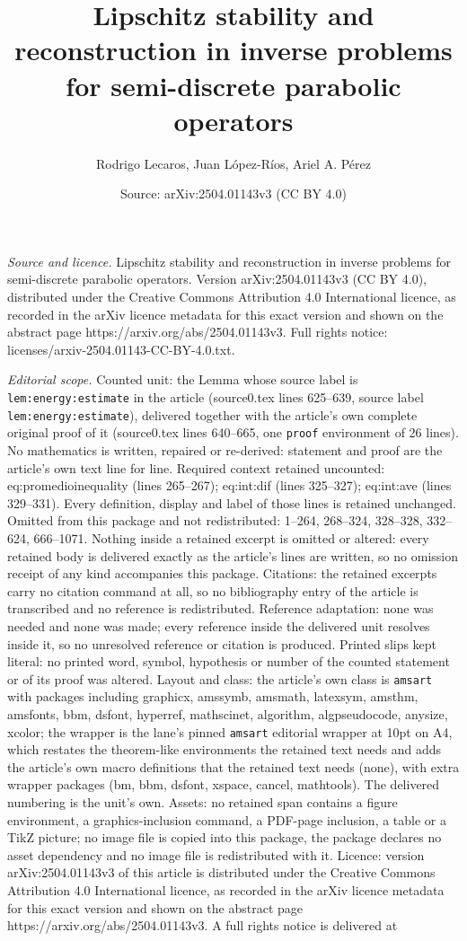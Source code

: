 \documentclass[10pt,a4paper]{amsart}
\title[Lipschitz stability and reconstruction in inverse problems f]{Lipschitz stability and reconstruction in inverse problems for semi-discrete parabolic operators}
\author{Rodrigo Lecaros, Juan L\'opez-R\'ios, Ariel A. P\'erez}
\date{Source: arXiv:2504.01143v3 (CC BY 4.0)}
\begin{document}
\maketitle

\noindent\emph{Source and licence.} Lipschitz stability and reconstruction in inverse problems for semi-discrete parabolic operators. Version arXiv:2504.01143v3 (CC BY 4.0), distributed under the Creative Commons Attribution 4.0 International licence, as recorded in the arXiv licence metadata for this exact version and shown on the abstract page https://arxiv.org/abs/2504.01143v3. Full rights notice: licenses/arxiv-2504.01143-CC-BY-4.0.txt.\par\smallskip

\noindent\textit{Editorial scope.} Counted unit: the Lemma whose source label is \texttt{lem:energy:estimate} in the article (source0.tex lines 625--639, source label \texttt{lem:energy:estimate}), delivered together with the article's own complete original proof of it (source0.tex lines 640--665, one \texttt{proof} environment of 26 lines). No mathematics is written, repaired or re-derived: statement and proof are the article's own text line for line. Required context retained uncounted: eq:promedioinequality (lines 265--267); eq:int:dif (lines 325--327); eq:int:ave (lines 329--331). Every definition, display and label of those lines is retained unchanged. Omitted from this package and not redistributed: 1--264, 268--324, 328--328, 332--624, 666--1071. Nothing inside a retained excerpt is omitted or altered: every retained body is delivered exactly as the article's lines are written, so no omission receipt of any kind accompanies this package. Citations: the retained excerpts carry no citation command at all, so no bibliography entry of the article is transcribed and no reference is redistributed. Reference adaptation: none was needed and none was made; every reference inside the delivered unit resolves inside it, so no unresolved reference or citation is produced. Printed slips kept literal: no printed word, symbol, hypothesis or number of the counted statement or of its proof was altered. Layout and class: the article's own class is \texttt{amsart} with packages including graphicx, amssymb, amsmath, latexsym, amsthm, amsfonts, bbm, dsfont, hyperref, mathscinet, algorithm, algpseudocode, anysize, xcolor; the wrapper is the lane's pinned \texttt{amsart} editorial wrapper at 10pt on A4, which restates the theorem-like environments the retained text needs and adds the article's own macro definitions that the retained text needs (none), with extra wrapper packages (bm, bbm, dsfont, xspace, cancel, mathtools). The delivered numbering is the unit's own. Assets: no retained span contains a figure environment, a graphics-inclusion command, a PDF-page inclusion, a table or a TikZ picture; no image file is copied into this package, the package declares no asset dependency and no image file is redistributed with it. Licence: version arXiv:2504.01143v3 of this article is distributed under the Creative Commons Attribution 4.0 International licence, as recorded in the arXiv licence metadata for this exact version and shown on the abstract page https://arxiv.org/abs/2504.01143v3. A full rights notice is delivered at 
\end{document}
